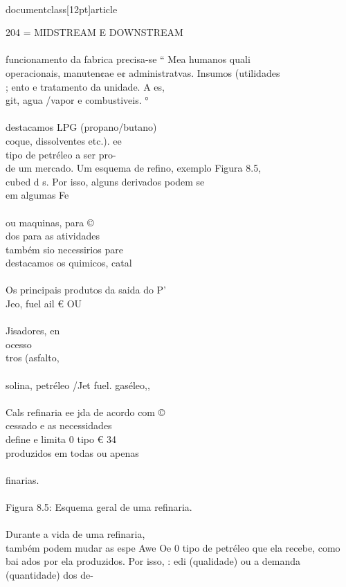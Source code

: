 \\documentclass[12pt]{article}
\begin{document}
204 = MIDSTREAM E DOWNSTREAM\\
\\
funcionamento da fabrica precisa-se “ Mea humanos quali\\
operacionais, manuten¢ae e¢ administratvas. Insumos (utilidades\\
; ento e tratamento da unidade. A es,\\
git, agua /vapor e combustiveis. °\\
\\
destacamos LPG (propano/butano)\\
coque, dissolventes etc.). ee\\
tipo de petréleo a ser pro-\\
de um mercado. Um esquema de refino, exemplo Figura 8.5,\\
cubed d s. Por isso, alguns derivados podem se\\
em algumas Fe\\
\\
ou maquinas, para ©\\
dos para as atividades\\
também sio necessirios pare\\
destacamos os quimicos, catal\\
\\
Os principais produtos da saida do P'\\
Jeo, fuel ail € OU\\
\\
Jisadores, en\\
ocesso\\
tros (asfalto,\\
\\
solina, petréleo /Jet fuel. gaséleo,,\\
\\
Cals refinaria ee jda de acordo com ©\\
cessado e as necessidades\\
define e limita 0 tipo € 34\\
produzidos em todas ou apenas\\
\\
finarias.\\
\\
Figura 8.5: Esquema geral de uma refinaria.\\
\\
Durante a vida de uma refinaria,\\
também podem mudar as espe Awe Oe 0 tipo de petréleo que ela recebe, como\\
bai ados por ela produzidos. Por isso, : edi (qualidade) ou a demanda (quantidade) dos de-\\
\end{document}
